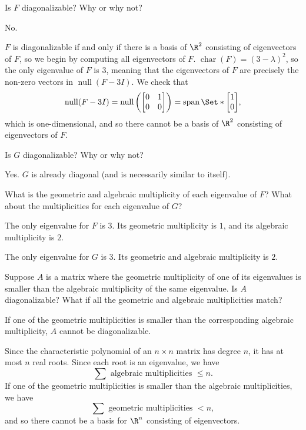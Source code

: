 \documentclass{problemset}
\DeclareMathOperator{\Span}{span}
\DeclareMathOperator{\Null}{null}
\DeclareMathOperator{\chr}{char}
\newcommand{\mat}[1]{\begin{bmatrix*}[r]#1\end{bmatrix*}}
\begin{document}
	\begin{parts}
		\item Is $F$ diagonalizable?  Why or why not?
			\begin{solution}
				No.

				$F$ is diagonalizable if and only if there is a basis of $\R^2$
				consisting of eigenvectors of $F$, so we begin by computing all
				eigenvectors of $F$.
				$\chr(F)=(3-\lambda)^2$, so the only eigenvalue of $F$ is $3$, 
				meaning that the eigenvectors of $F$ are precisely the non-zero
				vectors in $\Null(F-3I)$. We check that 
				\[
					\Null(F-3I)
					=\Null\left(\mat{0&1\\0&0}\right)
					=\Span\Set*{\mat{1\\0}},
				\]
				which is one-dimensional, and so there cannot be a basis of $\R^2$
				consisting of eigenvectors of $F$. 
			\end{solution}
		\item Is $G$ diagonalizable?  Why or why not?
			\begin{solution}
				Yes. $G$ is already diagonal (and is necessarily similar to itself).
			\end{solution}
		\item What is the geometric and algebraic multiplicity of each eigenvalue
			of $F$? What about the multiplicities for each eigenvalue of $G$?
			\begin{solution}
				The only eigenvalue for $F$ is $3$. Its geometric multiplicity is $1$, 
				and its algebraic multiplicity is $2$. 
				
				The only eigenvalue for $G$ is $3$. Its geometric and algebraic multiplicity is $2$.
			\end{solution}
		\item Suppose $A$ is a matrix where the geometric multiplicity of one of its eigenvalues
			is smaller than the algebraic multiplicity of the same eigenvalue.  Is
			$A$ diagonalizable?  What if all the geometric and algebraic multiplicities
			match?
		\begin{solution}
				If one of the geometric multiplicities is smaller than the corresponding
				algebraic multiplicity, $A$ cannot be diagonalizable. 
				
				Since the characteristic polynomial of an $n\times n$ matrix has degree $n$,
				it has at most $n$ real roots. Since each root is an eigenvalue, we have
				\[
					\sum \text{ algebraic multiplicities }\leq n.
				\]
				If one of the geometric multiplicities is smaller than the algebraic multiplicities,
				we have
				\[
					\sum \text{ geometric multiplicities } < n,
				\]
				and so there cannot be a basis for $\R^n$ consisting of eigenvectors.


\end{solution}
\end{parts}
\end{document}
